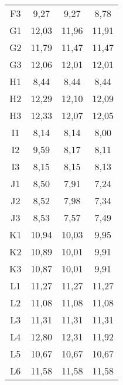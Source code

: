 \begin{center}
\begin{longtable}{cccc}
    F3    & 9,27  & 9,27  & 8,78 \\
    G1    & 12,03 & 11,96 & 11,91 \\
    G2    & 11,79 & 11,47 & 11,47 \\
    G3    & 12,06 & 12,01 & 12,01 \\
    H1    & 8,44  & 8,44  & 8,44 \\
    H2    & 12,29 & 12,10 & 12,09 \\
    H3    & 12,33 & 12,07 & 12,05 \\
    I1    & 8,14  & 8,14  & 8,00 \\
    I2    & 9,59  & 8,17  & 8,11 \\
    I3    & 8,15  & 8,15  & 8,13 \\
    J1    & 8,50  & 7,91  & 7,24 \\
    J2    & 8,52  & 7,98  & 7,34 \\
    J3    & 8,53  & 7,57  & 7,49 \\
    K1    & 10,94 & 10,03 & 9,95 \\
    K2    & 10,89 & 10,01 & 9,91 \\
    K3    & 10,87 & 10,01 & 9,91 \\
    L1    & 11,27 & 11,27 & 11,27 \\
    L2    & 11,08 & 11,08 & 11,08 \\
    L3    & 11,31 & 11,31 & 11,31 \\
    L4    & 12,80 & 12,31 & 11,92 \\
    L5    & 10,67 & 10,67 & 10,67 \\
    L6    & 11,58 & 11,58 & 11,58 \\
\end{longtable}
\end{center}

